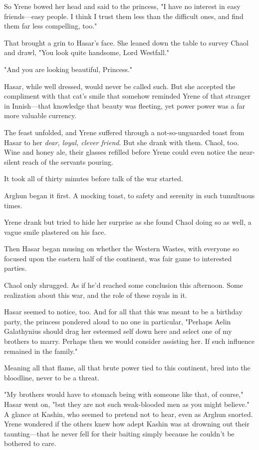 So Yrene bowed her head and said to the princess, "I have no interest in easy friends---easy people. I think I trust them less than the difficult ones, and find them far less compelling, too."

That brought a grin to Hasar's face. She leaned down the table to survey Chaol and drawl, "You look quite handsome, Lord Westfall."

"And you are looking beautiful, Princess."

Hasar, while well dressed, would never be called such. But she accepted the compliment with that cat's smile that somehow reminded Yrene of that stranger in Innish---that knowledge that beauty was fleeting, yet power
 power was a far more valuable currency.

The feast unfolded, and Yrene suffered through a not-so-unguarded toast from Hasar to her \emph{dear, loyal, clever friend}. But she drank with them. Chaol, too. Wine and honey ale, their glasses refilled before Yrene could even notice the near-silent reach of the servants pouring.

It took all of thirty minutes before talk of the war started.

Arghun began it first. A mocking toast, to safety and serenity in such tumultuous times.

Yrene drank but tried to hide her surprise as she found Chaol doing so as well, a vague smile plastered on his face.

Then Hasar began musing on whether the Western Wastes, with everyone so focused upon the eastern half of the continent, was fair game to interested parties.

Chaol only shrugged. As if he'd reached some conclusion this afternoon. Some realization about this war, and the role of these royals in it.

Hasar seemed to notice, too. And for all that this was meant to be a birthday party, the princess pondered aloud to no one in particular, "Perhaps Aelin Galathynius should drag her esteemed self down here and select one of my brothers to marry. Perhaps then we would consider assisting her. If such influence remained in the family."

Meaning all that flame, all that brute power  tied to this continent, bred into the bloodline, never to be a threat.

"My brothers would have to stomach being with someone like that, of course," Hasar went on, "but they are not such weak-blooded men as you might believe." A glance at Kashin, who seemed to pretend not to hear, even as Arghun snorted. Yrene wondered if the others knew how adept Kashin was at drowning out their taunting---that he never fell for their baiting simply because he couldn't be bothered to care.

